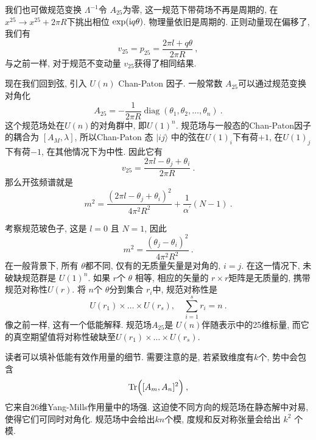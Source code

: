 我们也可做规范变换 $\Lambda^{-1}$令 $A_{25}$为零, 这一规范下带荷场不再是周期的, 
在$x^{25} \rightarrow x^{25}+2 \pi R$下挑出相位 $\exp (\mathrm{i} q \theta)$. 物理量依旧是周期的. 正则动量现在偏移了, 我们有
\begin{equation}
	v_{25}=p_{25}=\frac{2 \pi l+q \theta}{2 \pi R}\:, \label{8.6.7}
\end{equation}
与之前一样, 对于规范不变动量 $v_{25}$获得了相同结果.

现在我们回到弦, 引入 $U(n)$ Chan-Paton 因子. 一般常数 $A_{25}$可以通过规范变换对角化
\begin{equation}
	A_{25}=-\frac{1}{2 \pi R} \operatorname{diag}(\theta_{1}, \theta_{2}, \ldots, \theta_{n}) \:. \label{8.6.8}
\end{equation}
这个规范场处在$U(n)$的对角群中, 即$U(1)^{n}$. 规范场与一般态的Chan-Paton因子的耦合为 $[A_{M}, \lambda]$, 
所以Chan-Paton 态 $|i j\rangle$ 中的弦在$U(1)_{i}$下有荷$+1$, 在$U(1)_{j}$下有荷$-1$, 在其他情况下为中性. 因此它有
\begin{equation}
	v_{25}=\frac{2 \pi l-\theta_{j}+\theta_{i}}{2 \pi R} \:. \label{8.6.9}
\end{equation}
那么开弦频谱就是
\begin{equation}
	m^{2}=\frac{(2 \pi l-\theta_{j}+\theta_{i})^{2}}{4 \pi^{2} R^{2}}+\frac{1}{\alpha^{\prime}}(N-1) \:. \label{8.6.10}
\end{equation}

考察规范玻色子, 这是 $l=0$ 且 $N=1$, 因此
\begin{equation}
	m^{2}=\frac{(\theta_{j}-\theta_{i})^{2}}{4 \pi^{2} R^{2}} \:. \label{8.6.11}
\end{equation}
在一般背景下, 所有 $\theta$都不同, 仅有的无质量矢量是对角的, $i=j$. 在这一情况下, 未破缺规范群是 $U(1)^{n} $. 
如果 $r$个 $\theta$ 相等, 相应的矢量的 $r \times r$矩阵是无质量的, 携带规范对称性$U(r)$. 将 $n$个 $\theta$分到集合 $r_{i}$中, 规范对称性是
\begin{equation}
	U(r_{1}) \times \ldots \times U(r_{s}), \quad \sum_{i=1}^{s} r_{i}=n \:. \label{8.6.12}
\end{equation}
像之前一样, 这有一个低能解释. 规范场$A_{25}$是 $U(n)$伴随表示中的25维标量, 而它的真空期望值将对称性破缺至$U(r_{1}) \times \ldots \times U(r_{s})$.

读者可以填补低能有效作用量的细节. 需要注意的是, 若紧致维度有$k$个, 势中会包含
\begin{equation}
	\operatorname{Tr}\Bigl([A_{m}, A_{n}]^{2}\Bigr) \:, \label{8.6.13}
\end{equation}
它来自26维Yang-Mills作用量中的场强. 这迫使不同方向的规范场在静态解中对易, 使得它们可同时对角化. 规范场中会给出$kn$个模, 
度规和反对称张量会给出 $k^{2}$ 个模.

